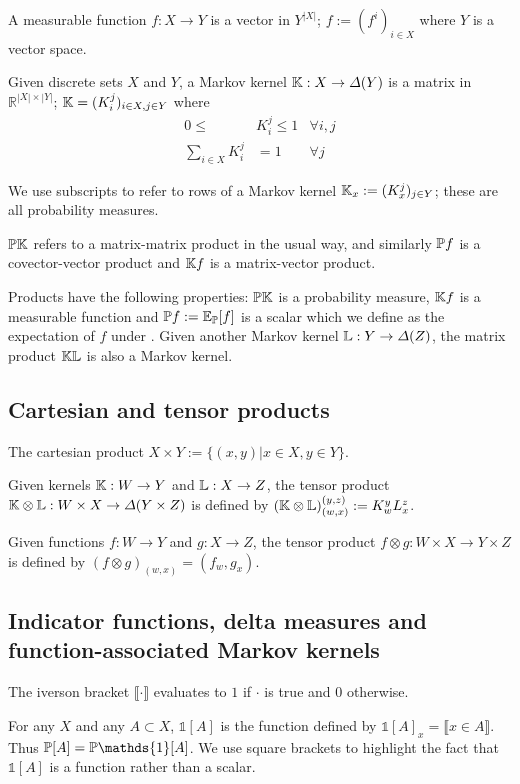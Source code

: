 A measurable function $f:X\to Y$ is a vector in $Y^{|X|}$; $f:=(f^i)_{i\in X}$ where $Y$ is a vector space.

Given discrete sets $X$ and $Y$, a Markov kernel $\mathbb{K}:X\to \Delta(Y)$ is a matrix in $\mathbb{R}^{|X|\times |Y|}$; $\mathbb{K} = (K_{i}^j)_{i\in X,j\in Y}$ where
\begin{align}
	0\leq &K_{i}^j \leq 1 &\forall i,j\\
	\sum_{i\in X} K_{i}^j &= 1 & \forall j
\end{align}

We use subscripts to refer to rows of a Markov kernel $\mathbb{K}_x:=(K_{x}^j)_{j\in Y}$; these are all probability measures.

$\mathbb{P}\mathbb{K}$ refers to a matrix-matrix product in the usual way, and similarly $\mathbb{P}f$ is a covector-vector product and $\mathbb{K}f$ is a matrix-vector product.

Products have the following properties: $\mathbb{P}\mathbb{K}$ is a probability measure, $\mathbb{K}f$ is a measurable function and $\mathbb{P}f:=\mathbb{E}_{\mathbb{P}}[f]$ is a scalar which we define as the expectation of $f$ under . Given another Markov kernel $\mathbb{L}:Y\to \Delta(Z)$, the matrix product $\mathbb{K}\mathbb{L}$ is also a Markov kernel.

\subsection{Cartesian and tensor products}

The cartesian product $X\times Y:=\{(x,y)|x\in X, y\in Y\}$.

Given kernels $\mathbb{K}:W\to Y$ and $\mathbb{L}:X\to Z$, the tensor product $\mathbb{K}\otimes\mathbb{L}:W\times X\to \Delta(Y\times Z)$ is defined by $(\mathbb{K}\otimes\mathbb{L})_{(w,x)}^{(y,z)}:=K_{w}^y L_{x}^z$.

Given functions $f:W\to Y$ and $g:X\to Z$, the tensor product $f\otimes g:W\times X\to Y\times Z$ is defined by $(f\otimes g)_{(w,x)}=(f_w,g_x)$.

\subsection{Indicator functions, delta measures and function-associated Markov kernels}

The iverson bracket $\llbracket \cdot \rrbracket$ evaluates to $1$ if $\cdot$ is true and $0$ otherwise.

For any $X$ and any $A\subset X$, $\mathds{1}[A]$ is the function defined by $\mathds{1}[A]_x= \llbracket x\in A \rrbracket$. Thus $\prob{P}[A]=\prob{P}\mathds{1}[A]$. We use square brackets to highlight the fact that $\mathds{1}[A]$ is a function rather than a scalar.

